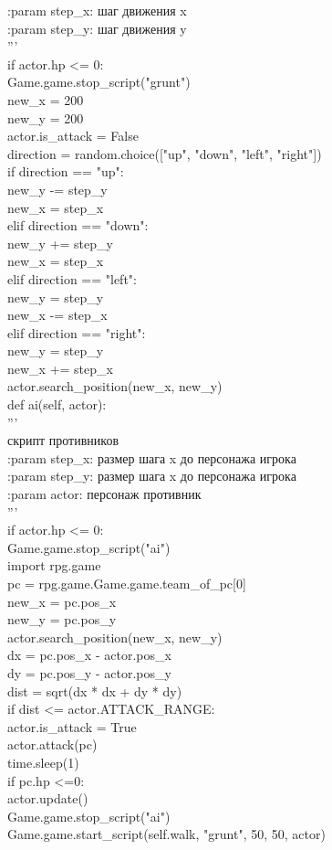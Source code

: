 :param step\_x: шаг движения x\\
:param step\_y: шаг движения y\\
'''\\
if actor.hp <= 0:\\
Game.game.stop\_script("grunt")\\
new\_x = 200\\
new\_y = 200\\
actor.is\_attack = False\\
direction = random.choice(["up", "down", "left", "right"])\\
if direction == "up":\\
new\_y -= step\_y\\
new\_x = step\_x\\
elif direction == "down":\\
new\_y += step\_y\\
new\_x = step\_x\\
elif direction == "left":\\
new\_y = step\_y\\
new\_x -= step\_x\\
elif direction == "right":\\
new\_y = step\_y\\
new\_x += step\_x\\

actor.search\_position(new\_x, new\_y)\\

def ai(self, actor):\\
'''\\
скрипт противников\\

:param step\_x: размер шага x до персонажа игрока\\
:param step\_y: размер шага x до персонажа игрока\\
:param actor: персонаж противник\\
'''\\
if actor.hp <= 0:\\
Game.game.stop\_script("ai")\\
import rpg.game\\
pc = rpg.game.Game.game.team\_of\_pc[0]\\
new\_x = pc.pos\_x\\
new\_y = pc.pos\_y\\

actor.search\_position(new\_x, new\_y)\\
dx = pc.pos\_x - actor.pos\_x\\
dy = pc.pos\_y - actor.pos\_y\\
dist = sqrt(dx * dx + dy * dy)\\
if dist <= actor.ATTACK\_RANGE:\\
actor.is\_attack = True\\
actor.attack(pc)\\
time.sleep(1)\\
if pc.hp <=0:\\
actor.update()\\
Game.game.stop\_script("ai")\\
Game.game.start\_script(self.walk, "grunt", 50, 50, actor)\\

